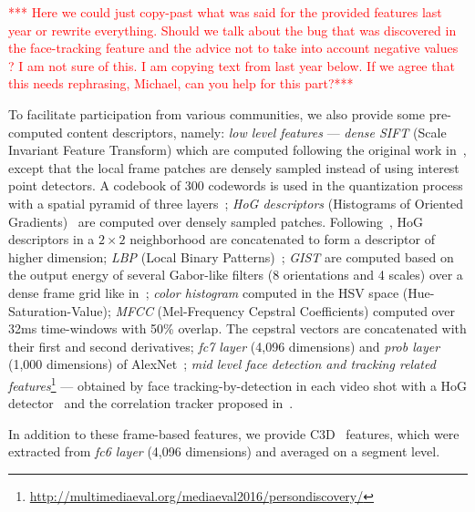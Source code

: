 \documentclass[sigconf]{acmart-me}
\begin{document}
\textcolor{red}{*** Here we could just copy-past what was said for the provided features last year or rewrite everything. Should we talk about the bug that was discovered in the face-tracking feature and the advice not to take into account negative values ? I am not sure of this. I am copying text from last year below. If we agree that this needs rephrasing, Michael, can you help for this part?***}

To facilitate participation from various communities, we also
provide some pre-computed content descriptors, namely: \emph{low
level features} --- \emph{dense SIFT} (Scale Invariant Feature
Transform) which are computed following the original work
in~\cite{Lowe2004}, except that the local frame patches are densely
sampled instead of using interest point detectors. A codebook of 300
codewords is used in the quantization process with a spatial pyramid
of three layers~\cite{Lazebnik2006}; \emph{HoG descriptors}
(Histograms of Oriented Gradients)~\cite{Dalal2005} are computed
over densely sampled patches. Following~\cite{Xiao2010}, HoG
descriptors in a $2\times2$ neighborhood are concatenated to form a
descriptor of higher dimension; \emph{LBP} (Local Binary
Patterns)~\cite{Ojala2002}; \emph{GIST} are computed based on the
output energy of several Gabor-like filters (8 orientations and 4
scales) over a dense frame grid like in~\cite{Oliva2001};
\emph{color histogram} computed in the HSV space
(Hue-Saturation-Value); \emph{MFCC} (Mel-Frequency Cepstral
Coefficients) computed over 32ms time-windows with 50\%
overlap. The cepstral vectors are concatenated with their first and
second derivatives; \emph{fc7 layer} (4,096 dimensions) and
\emph{prob layer} (1,000 dimensions) of AlexNet~\cite{Jiang2015};
\emph{mid level face detection and tracking related
features}\footnote{\url{http://multimediaeval.org/mediaeval2016/persondiscovery/}}
--- obtained by face tracking-by-detection in each video shot with a
HoG detector~\cite{Dalal2005} and the correlation tracker proposed
in~\cite{Danelljan2014}.

In addition to these frame-based features, we provide C3D~\cite{tran2015learning} features, which were extracted from \emph{fc6 layer} (4,096 dimensions) and averaged on a segment level.
\end{document}
